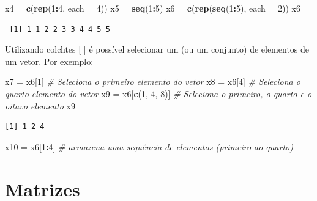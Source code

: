 \documentclass[]{book}
\newenvironment{Shaded}{\begin{snugshade}}{\end{snugshade}}
\newcommand{\CommentTok}[1]{\textcolor[rgb]{0.56,0.35,0.01}{\textit{#1}}}
\newcommand{\DataTypeTok}[1]{\textcolor[rgb]{0.13,0.29,0.53}{#1}}
\newcommand{\DecValTok}[1]{\textcolor[rgb]{0.00,0.00,0.81}{#1}}
\newcommand{\KeywordTok}[1]{\textcolor[rgb]{0.13,0.29,0.53}{\textbf{#1}}}
\newcommand{\NormalTok}[1]{#1}
\newcommand{\OperatorTok}[1]{\textcolor[rgb]{0.81,0.36,0.00}{\textbf{#1}}}
\newcommand{\StringTok}[1]{\textcolor[rgb]{0.31,0.60,0.02}{#1}}
\begin{document}
\begin{Shaded}
\begin{Highlighting}[]
\NormalTok{x4 =}\StringTok{ }\KeywordTok{c}\NormalTok{(}\KeywordTok{rep}\NormalTok{(}\DecValTok{1}\OperatorTok{:}\DecValTok{4}\NormalTok{, }\DataTypeTok{each =} \DecValTok{4}\NormalTok{))}
\NormalTok{x5 =}\StringTok{ }\KeywordTok{seq}\NormalTok{(}\DecValTok{1}\OperatorTok{:}\DecValTok{5}\NormalTok{)}
\NormalTok{x6 =}\StringTok{ }\KeywordTok{c}\NormalTok{(}\KeywordTok{rep}\NormalTok{(}\KeywordTok{seq}\NormalTok{(}\DecValTok{1}\OperatorTok{:}\DecValTok{5}\NormalTok{), }\DataTypeTok{each =} \DecValTok{2}\NormalTok{))}
\NormalTok{x6}
\end{Highlighting}
\end{Shaded}

\begin{verbatim}
 [1] 1 1 2 2 3 3 4 4 5 5
\end{verbatim}

Utilizando colchtes {[} {]} é possível selecionar um (ou um conjunto) de elementos de um vetor. Por exemplo:

\begin{Shaded}
\begin{Highlighting}[]
\NormalTok{x7 =}\StringTok{ }\NormalTok{x6[}\DecValTok{1}\NormalTok{] }\CommentTok{# Seleciona o primeiro elemento do vetor }
\NormalTok{x8 =}\StringTok{ }\NormalTok{x6[}\DecValTok{4}\NormalTok{] }\CommentTok{#  Seleciona o quarto elemento do vetor }
\NormalTok{x9 =}\StringTok{ }\NormalTok{x6[}\KeywordTok{c}\NormalTok{(}\DecValTok{1}\NormalTok{, }\DecValTok{4}\NormalTok{, }\DecValTok{8}\NormalTok{)] }\CommentTok{# Seleciona o primeiro, o quarto e o oitavo elemento}
\NormalTok{x9}
\end{Highlighting}
\end{Shaded}

\begin{verbatim}
[1] 1 2 4
\end{verbatim}

\begin{Shaded}
\begin{Highlighting}[]
\NormalTok{x10 =}\StringTok{ }\NormalTok{x6[}\DecValTok{1}\OperatorTok{:}\DecValTok{4}\NormalTok{] }\CommentTok{# armazena uma sequência de elementos (primeiro ao quarto)}
\end{Highlighting}
\end{Shaded}

\hypertarget{matrizes}{%
\section{Matrizes}\label{matrizes}}
\end{document}
